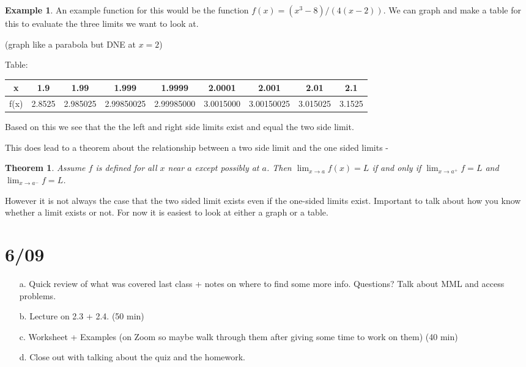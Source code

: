\documentclass[12pt,reqno]{article}
\newtheorem{Theorem}{Theorem}
\theoremstyle{definition}
\newtheorem*{Example}{Example}
\begin{document}
\begin{Example}
	An example function for this would be the function $f(x) = (x^3 - 8)/(4(x - 2))$. We can graph and make a table for this to evaluate the three limits we want to look at. 
	
	(graph like a parabola but DNE at $x = 2$) 
	
	Table: 
	
	\begin{tabular}{| c | c | c | c | c | c | c | c | c |}
		\hline
		x & 1.9 & 1.99 & 1.999 & 1.9999 & 2.0001 & 2.001 & 2.01 & 2.1 \\ \hline
		f(x) & 2.8525 & 2.985025 & 2.99850025 & 2.99985000 & 3.0015000 & 3.00150025 & 3.015025 & 3.1525 \\ \hline
	\end{tabular}
	
	Based on this we see that the the left and right side limits exist and equal the two side limit. 
\end{Example}

This does lead to a theorem about the relationship between a two side limit and the one sided limits - 
\begin{Theorem}
	Assume $f$ is defined for all $x$ near $a$ except possibly at $a$. Then $\lim_{x \to a} f(x) = L$ if and only if $\lim_{x \to a^+ } f = L$ and $\lim_{x \to a^{-}} f = L$. 
\end{Theorem}

However it is not always the case that the two sided limit exists even if the one-sided limits exist. Important to talk about how you know whether a limit exists or not. For now it is easiest to look at either a graph or a table. 

\section{6/09}

\begin{enumerate}
	\item[a.] Quick review of what was covered last class + notes on where to find some more info. Questions? Talk about MML and access problems.
	\item[b.] Lecture on 2.3 + 2.4. (50 min) 
	\item[c.] Worksheet + Examples (on Zoom so maybe walk through them after giving some time to work on them) (40 min) 
	\item[d.] Close out with talking about the quiz and the homework. 
\end{enumerate}
\end{document}
